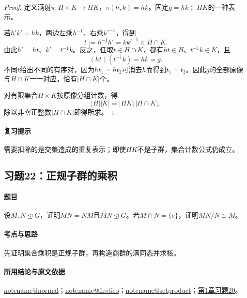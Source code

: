 \documentclass[UTF8,a4paper,11pt,fontset=windows]{ctexart}
\makeatletter
\newcommand{\noteref}[1]{\hyperref[note:#1]{\csname notename@#1\endcsname}}
\newcommand{\exref}[2]{\hyperref[ex:#1:#2]{第#1章习题#2}}
\makeatother
\begin{document}
\begin{proof}
定义满射$\pi:H\times K\to HK$，$\pi(h,k)=hk$。固定$g=hk\in HK$的一种表示。

若$h'k'=hk$，两边左乘$h^{-1}$、右乘$k'^{-1}$，得到
\[
t:=h^{-1}h'=kk'^{-1}\in H\cap K.
\]
由此$h'=ht$、$k'=t^{-1}k$。反之，任取$t\in H\cap K$，都有$ht\in H$、$t^{-1}k\in K$，且
\[
(ht)(t^{-1}k)=hk=g.
\]
不同$t$给出不同的有序对，因为$ht_1=ht_2$可消去$h$而得到$t_1=t_2$。因此$g$的全部原像与$H\cap K$一一对应，恰有$|H\cap K|$个。

对有限集合$H\times K$按原像分组计数，得
\[
|H||K|=|HK|\,|H\cap K|,
\]
除以非零正整数$|H\cap K|$即得所求。
\end{proof}

\paragraph{复习提示}
需要扣除的是交集造成的重复表示；即使$HK$不是子群，集合计数公式仍成立。


\subsection{习题22：\texorpdfstring{正规子群的乘积}{正规子群的乘积}}
\label{ex:1:22}

\paragraph{题目}
设$M,N\trianglelefteq G$，证明$MN=NM$且$MN\trianglelefteq G$。若$M\cap N=\{e\}$，证明$MN/N\cong M$。

\paragraph{考点与思路}
先证明集合乘积是正规子群，再构造商群的满同态并求核。

\paragraph{所用结论与原文依据}
\noteref{normal}；\noteref{firstiso}；\noteref{setproduct}；\exref{1}{20}。

\end{document}
